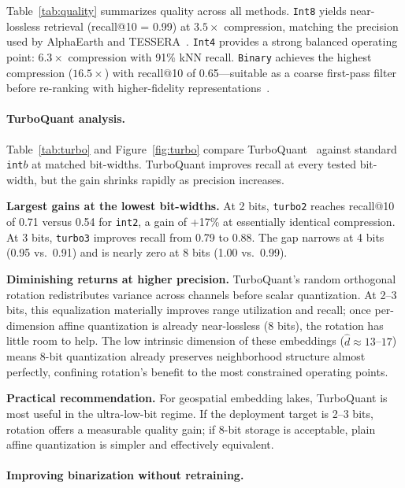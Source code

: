 \documentclass{article}
\begin{document}
Table~\ref{tab:quality} summarizes quality across all methods.
\texttt{Int8} yields near-lossless retrieval (recall@10 = 0.99) at $3.5\times$ compression, matching the precision used by AlphaEarth and TESSERA~\citep{brown2025alphaearth,feng2025tessera}.
\texttt{Int4} provides a strong balanced operating point: $6.3\times$ compression with 91\% kNN recall.
\texttt{Binary} achieves the highest compression ($16.5\times$) with recall@10 of 0.65---suitable as a coarse first-pass filter before re-ranking with higher-fidelity representations~\citep{wang2018binary,jegou2011pq}.

\paragraph{TurboQuant analysis.}

Table~\ref{tab:turbo} and Figure~\ref{fig:turbo} compare TurboQuant~\citep{zandieh2025turboquant} against standard \texttt{int}$b$ at matched bit-widths.
TurboQuant improves recall at every tested bit-width, but the gain shrinks rapidly as precision increases.

\textbf{Largest gains at the lowest bit-widths.}
At 2 bits, \texttt{turbo2} reaches recall@10 of 0.71 versus 0.54 for \texttt{int2}, a gain of +17\% at essentially identical compression.
At 3 bits, \texttt{turbo3} improves recall from 0.79 to 0.88.
The gap narrows at 4 bits (0.95 vs.\ 0.91) and is nearly zero at 8 bits (1.00 vs.\ 0.99).

\textbf{Diminishing returns at higher precision.}
TurboQuant's random orthogonal rotation redistributes variance across channels before scalar quantization.
At 2--3 bits, this equalization materially improves range utilization and recall; once per-dimension affine quantization is already near-lossless (8 bits), the rotation has little room to help.
The low intrinsic dimension of these embeddings ($\hat{d} \approx 13$--$17$) means 8-bit quantization already preserves neighborhood structure almost perfectly, confining rotation's benefit to the most constrained operating points.

\textbf{Practical recommendation.}
For geospatial embedding lakes, TurboQuant is most useful in the ultra-low-bit regime.
If the deployment target is 2--3 bits, rotation offers a measurable quality gain; if 8-bit storage is acceptable, plain affine quantization is simpler and effectively equivalent.

\paragraph{Improving binarization without retraining.}
\end{document}
